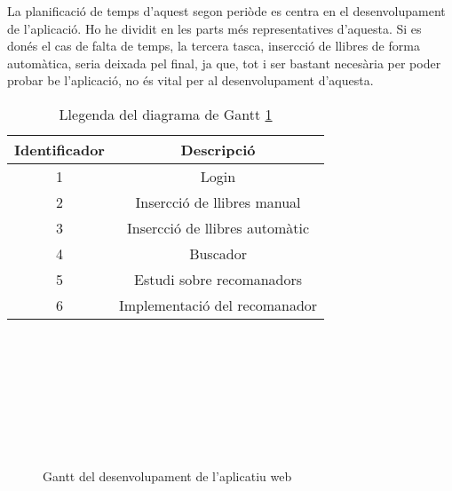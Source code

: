 La planificació de temps d'aquest segon periòde es centra en el desenvolupament de l'aplicació. Ho he dividit en les parts més representatives d'aquesta. Si es donés el cas de falta de temps, la tercera tasca, insercció de llibres de forma automàtica, seria deixada pel final, ja que, tot i ser bastant necesària per poder probar be l'aplicació, no és vital per al desenvolupament d'aquesta.

\begin{table}[h!]
	\caption{Llegenda del diagrama de Gantt \ref{gantt-desenvolupament}}
	\label{llegenda-gantt-analisi}
	\begin{center}
		\begin{tabular}{| c | c |}
			\hline
			{\bf Identificador}	& {\bf Descripció} \\ \hline
			1					& Login \\
			2					& Insercció de llibres manual \\
			3					& Insercció de llibres automàtic \\
			4					& Buscador \\
			5					& Estudi sobre recomanadors \\
			6					& Implementació del recomanador \\ \hline
		\end{tabular}
	\end{center}
\end{table}

\begin{figure}[h!]
	\caption{Gantt del desenvolupament de l'aplicatiu web}
	\label{gantt-desenvolupament}
	\begin{center}
		\begin{ganttchart}[vgrid]{22}
			 \\
			 \\
			
			 \\
			 \\
			 \\
			 \\
			 \\
		\end{ganttchart}
	\end{center}
\end{figure}
